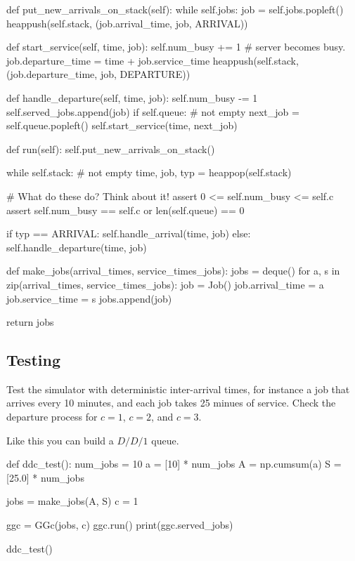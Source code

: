 \begin{exercise}
\begin{solution}
\begin{pyverbatim}
    def put_new_arrivals_on_stack(self):
        while self.jobs:
            job = self.jobs.popleft()
            heappush(self.stack, (job.arrival_time, job, ARRIVAL))

    def start_service(self, time, job):
        self.num_busy += 1  # server becomes busy.
        job.departure_time = time + job.service_time
        heappush(self.stack, (job.departure_time, job, DEPARTURE))

    def handle_departure(self, time, job):
        self.num_busy -= 1
        self.served_jobs.append(job)
        if self.queue:  # not empty
            next_job = self.queue.popleft()
            self.start_service(time, next_job)

    def run(self):
        self.put_new_arrivals_on_stack()

        while self.stack:  # not empty
            time, job, typ = heappop(self.stack)

            # What do these do? Think about it!
            assert 0 <= self.num_busy <= self.c
            assert self.num_busy == self.c or len(self.queue) == 0

            if typ == ARRIVAL:
                self.handle_arrival(time, job)
            else:
                self.handle_departure(time, job)


def make_jobs(arrival_times, service_times_jobs):
    jobs = deque()
    for a, s in zip(arrival_times, service_times_jobs):
        job = Job()
        job.arrival_time = a
        job.service_time = s
        jobs.append(job)

    return jobs
\end{pyverbatim}
\end{solution}
\end{exercise}


\subsection{Testing}
\label{sec:testing-1}

\begin{exercise}
Test the simulator with deterministic inter-arrival times, for instance a job that arrives every 10 minutes, and each job takes 25 minues of service. Check the departure process for $c=1$, $c=2$, and $c=3$. 
\begin{solution}
Like this you can build a $D/D/1$ queue.
\begin{pyverbatim}
def ddc_test():
    num_jobs = 10
    a = [10] * num_jobs
    A = np.cumsum(a)
    S = [25.0] * num_jobs

    jobs = make_jobs(A, S)
    c = 1

    ggc = GGc(jobs, c)
    ggc.run()
    print(ggc.served_jobs)


ddc_test()
\end{pyverbatim}
\end{solution}

\end{exercise}

